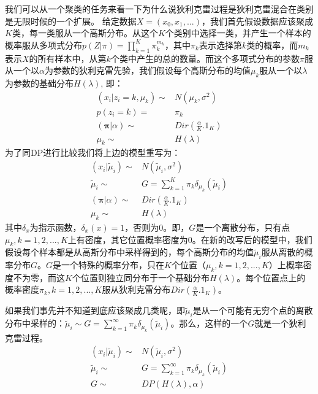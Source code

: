 我们可以从一个聚类的任务来看一下为什么说狄利克雷过程是狄利克雷混合在类别是无限时候的一个扩展。
给定数据$X=(x_0, x_1, ...)$，我们首先假设数据应该聚成$K$类，每一类服从一个高斯分布。从这个$K$个类别中选择一类，并产生一个样本的概率服从多项式分布$p(Z|\pi)=\prod_{k=1}^{K} \pi_k^{m_k}$，其中$\pi_k$表示选择第$k$类的概率，而$m_k$表示$X$的所有样本中，从第$k$个类中产生的总的数量。而这个多项式分布的参数$\pi$服从一个以$\alpha$为参数的狄利克雷先验，我们假设每个高斯分布的均值$\mu_k$服从一个以$\lambda$为参数的基础分布$H(\lambda)$, 即：
\begin{displaymath}
\begin{split}
(x_i|z_i=k, \mu_k) \sim & N(\mu_k, \sigma^2)\\
p(z_i=k) = & \pi_k\\
(\boldsymbol{\pi}|\alpha) \sim &Dir(\frac{\alpha}{K} . \mathrm{1}_{K} )\\
\mu_k \sim & H(\lambda)
\end{split}
\end{displaymath}
为了同DP进行比较我们将上边的模型重写为：
\begin{displaymath}
\begin{split}
(x_i|\tilde{\mu}_i) \sim & N(\tilde{\mu}_i, \sigma^2)\\
\tilde{\mu}_i \sim & G=\sum_{k=1}^{K}\pi_k\delta_{\mu_k}(\tilde{\mu}_i) \\
(\boldsymbol{\pi}|\alpha) \sim &Dir(\frac{\alpha}{K} . \mathrm{1}_{K} )\\
\mu_k \sim & H(\lambda)
\end{split}
\end{displaymath}
其中$\delta_{x}$为指示函数，$\delta_{x}(x)=1$，否则为0。即，$G$是一个离散分布，只有点$\mu_k, k=1,2,...,K$上有密度，其它位置概率密度为0。在新的改写后的模型中，我们假设每个样本都是从高斯分布中采样得到的，每个高斯分布的均值$\tilde{\mu}_i$服从离散的概率分布$G$。$G$是一个特殊的概率分布，只在$K$个位置（$\mu_k, k=1,2,...,K$）上概率密度不为零，而这$K$个位置则独立同分布于一个基础分布$H(\lambda)$。每个位置点上的概率密度$\pi_k, k=1,2,...,K$服从狄利克雷分布$Dir(\frac{\alpha}{K} . \mathrm{1}_{K})$。

如果我们事先并不知道到底应该聚成几类呢，即$\tilde{\mu}_i$是从一个可能有无穷个点的离散分布中采样的：$\tilde{\mu}_i \sim G=\sum_{k=1}^{\infty}\pi_k\delta_{\mu_k}(\tilde{\mu}_i)$。那么，这样的一个$G$就是一个狄利克雷过程。
\begin{displaymath}
\begin{split}
(x_i|\tilde{\mu}_i) \sim & N(\tilde{\mu}_i, \sigma^2)\\
\tilde{\mu}_i \sim & G=\sum_{k=1}^{\infty}\pi_k\delta_{\mu_k}(\tilde{\mu}_i) \\
G \sim & DP(H(\lambda), \alpha)\\
\end{split}
\end{displaymath}

